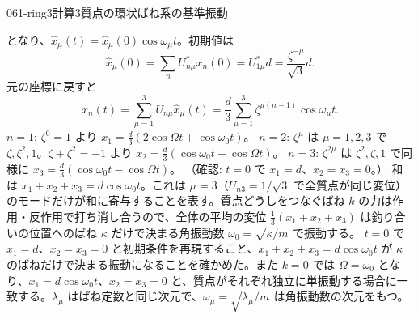 \documentclass[uplatex,dvipdfmx,a4paper,11pt]{jsarticle}
\begin{document}
\begin{mondai}{061-ring3}{計算}{3質点の環状ばね系の基準振動}
\begin{tadashii}
\[\]
となり、$\hat{x}_{\mu}(t)=\hat{x}_{\mu}(0)\cos\omega_{\mu}t$。初期値は
\[
\hat{x}_{\mu}(0)=\sum_n U_{n\mu}^{*}x_n(0)=U_{1\mu}^{*}d=\frac{\zeta^{-\mu}}{\sqrt{3}}d .
\]
元の座標に戻すと
\[
x_n(t)=\sum_{\mu=1}^{3}U_{n\mu}\hat{x}_{\mu}(t)=\frac{d}{3}\sum_{\mu=1}^{3}\zeta^{\mu(n-1)}\cos\omega_{\mu}t .
\]
$n=1$: $\zeta^{0}=1$ より $x_1=\frac{d}{3}(2\cos\Omega t+\cos\omega_0t)$。
$n=2$: $\zeta^{\mu}$ は $\mu=1,2,3$ で $\zeta,\zeta^{2},1$。$\zeta+\zeta^{2}=-1$ より $x_2=\frac{d}{3}(\cos\omega_0t-\cos\Omega t)$。
$n=3$: $\zeta^{2\mu}$ は $\zeta^{2},\zeta,1$ で同様に $x_3=\frac{d}{3}(\cos\omega_0t-\cos\Omega t)$。
（確認: $t=0$ で $x_1=d$、$x_2=x_3=0$。）
和は $x_1+x_2+x_3=d\cos\omega_0t$。これは $\mu=3$（$U_{n3}=1/\sqrt{3}$ で全質点が同じ変位）のモードだけが和に寄与することを表す。質点どうしをつなぐばね $k$ の力は作用・反作用で打ち消し合うので、全体の平均の変位 $\frac{1}{3}(x_1+x_2+x_3)$ は釣り合いの位置へのばね $\kappa$ だけで決まる角振動数 $\omega_0=\sqrt{\kappa/m}$ で振動する。
\kenzan $t=0$ で $x_1=d$、$x_2=x_3=0$ と初期条件を再現すること、$x_1+x_2+x_3=d\cos\omega_0t$ が $\kappa$ のばねだけで決まる振動になることを確かめた。また $k=0$ では $\Omega=\omega_0$ となり、$x_1=d\cos\omega_0t$、$x_2=x_3=0$ と、質点がそれぞれ独立に単振動する場合に一致する。$\lambda_{\mu}$ はばね定数と同じ次元で、$\omega_{\mu}=\sqrt{\lambda_{\mu}/m}$ は角振動数の次元をもつ。
\end{tadashii}
\end{mondai}
\end{document}
